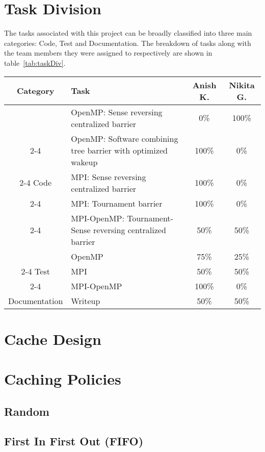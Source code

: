 \documentclass[11pt,pdftex,twocolumn]{article}
\begin{document}
\section{Task Division}
The tasks associated with this project can be broadly classified into three main categories: Code, Test and Documentation. The breakdown of tasks along with the team members they were assigned to respectively are shown in table~\ref{tab:taskDiv}.
\begin{table*}[t]
\centering
\begin{tabular}{| c | p{3.5in} | c | c |}
\hline
Category & Task & Anish K. & Nikita G.\\
\hline\hline
& OpenMP: Sense reversing centralized barrier & 0\% & 100\%\\
\cline{2-4}
& OpenMP: Software combining tree barrier with optimized wakeup & 100\% & 0\%\\
\cline{2-4}
Code & MPI: Sense reversing centralized barrier & 100\% & 0\%\\
\cline{2-4}
& MPI: Tournament barrier & 100\% & 0\%\\
\cline{2-4}
& MPI-OpenMP: Tournament-Sense reversing centralized barrier & 50\% & 50\%\\
\hline
& OpenMP & 75\% & 25\%\\
\cline{2-4}
Test & MPI & 50\% & 50\%\\
\cline{2-4}
& MPI-OpenMP & 100\% & 0\%\\
\hline
Documentation & Writeup & 50\% & 50\%\\
\hline
\end{tabular}
\caption{Task Division for Project 3}
\label{tab:taskDiv}
\end{table*}

\section{Cache Design}
\label{sec:cacheDesign}
\lipsum

\section{Caching Policies}
\label{sec:cachePol}
\subsection{Random}
\lipsum

\subsection{First In First Out (FIFO)}
\lipsum
\end{document}
